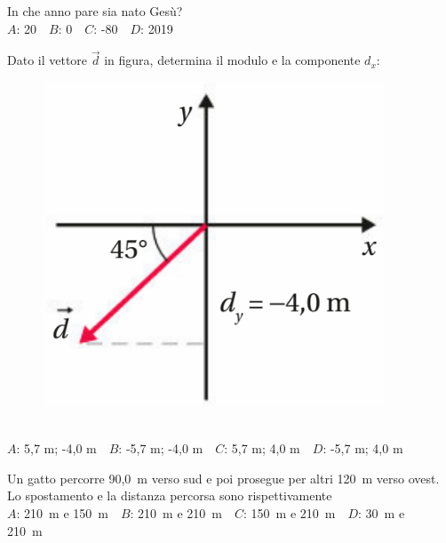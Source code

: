 \mcquestionfooter



\def\mcquestionnumber{6}


\mcquestionheader In che anno pare sia nato Gesù?\\
{$A$}: 20\ \ {$B$}: 0\ \ {$C$}: -80\ \ {$D$}: 2019\ \ 

\mcquestionfooter



\def\mcquestionnumber{7}


\mcquestionheader Dato il vettore $\vec{d}$ in figura, determina il modulo e la componente $d_x$: \begin{figure}[h!]   \begin{center}     \includegraphics[scale=0.35]{vettored.png}   \end{center} \end{figure}\\
{$A$}: 5,7 m; -4,0 m\ \ {$B$}: -5,7 m; -4,0 m\ \ {$C$}: 5,7 m; 4,0 m\ \ {$D$}: -5,7 m; 4,0 m\ \ 

\mcquestionfooter



\def\mcquestionnumber{8}


\mcquestionheader Un gatto percorre 90,0~m verso sud e poi prosegue per altri 120~m verso ovest. Lo spostamento e la distanza percorsa sono rispettivamente\\
{$A$}: 210~m e 150~m\ \ {$B$}: 210~m e 210~m\ \ {$C$}: 150~m e 210~m\ \ {$D$}: 30~m e 210~m\ \ 

\mcquestionfooter



\def\mcquestionnumber{9}


